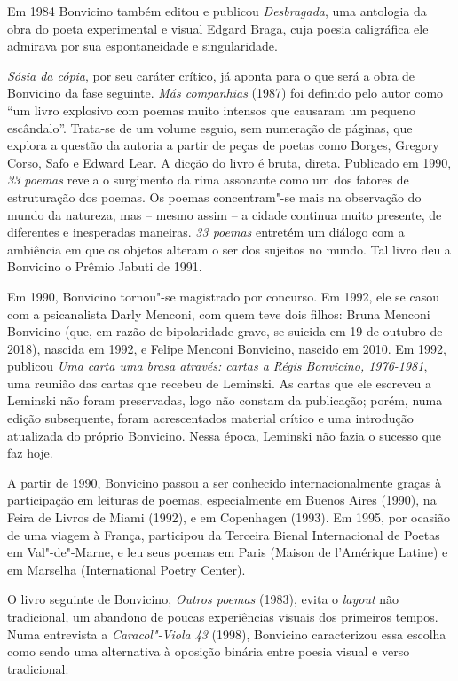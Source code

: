 Em 1984 Bonvicino também editou e publicou \emph{Desbragada}, uma
antologia da obra do poeta experimental e visual Edgard Braga, cuja
poesia caligráfica ele admirava por sua espontaneidade e singularidade.

\emph{Sósia da cópia}, por seu caráter crítico, já aponta para o que
será a obra de Bonvicino da fase seguinte. \emph{Más companhias} (1987)
foi definido pelo autor como ``um livro explosivo com poemas muito
intensos que causaram um pequeno escândalo''. Trata-se de um volume
esguio, sem numeração de páginas, que explora a questão da autoria a
partir de peças de poetas como Borges, Gregory Corso, Safo e Edward
Lear. A dicção do livro é bruta, direta. Publicado em 1990, \emph{33
poemas} revela o surgimento da rima assonante como um dos fatores de
estruturação dos poemas. Os poemas concentram"-se mais na observação do
mundo da natureza, mas -- mesmo assim -- a cidade continua muito
presente, de diferentes e inesperadas maneiras. \emph{33 poemas}
entretém um diálogo com a ambiência em que os objetos alteram o ser dos
sujeitos no mundo. Tal livro deu a Bonvicino o Prêmio Jabuti de 1991.

Em 1990, Bonvicino tornou"-se magistrado por concurso. Em 1992, ele se
casou com a psicanalista Darly Menconi, com quem teve dois filhos: Bruna
Menconi Bonvicino (que, em razão de bipolaridade grave, se suicida em 19
de outubro de 2018), nascida em 1992, e Felipe Menconi Bonvicino,
nascido em 2010. Em 1992, publicou \emph{Uma carta uma brasa através:
cartas a Régis Bonvicino, 1976-1981}, uma reunião das cartas que recebeu
de Leminski. As cartas que ele escreveu a Leminski não foram
preservadas, logo não constam da publicação; porém, numa edição
subsequente, foram acrescentados material crítico e uma introdução
atualizada do próprio Bonvicino. Nessa época, Leminski não fazia o
sucesso que faz hoje.

A partir de 1990, Bonvicino passou a ser conhecido internacionalmente
graças à participação em leituras de poemas, especialmente em Buenos
Aires (1990), na Feira de Livros de Miami (1992), e em Copenhagen
(1993). Em 1995, por ocasião de uma viagem à França, participou da
Terceira Bienal Internacional de Poetas em Val"-de"-Marne, e leu seus
poemas em Paris (Maison de l'Amérique Latine) e em Marselha
(International Poetry Center).

O livro seguinte de Bonvicino, \emph{Outros poemas} (1983), evita o
\emph{layout} não tradicional, um abandono de poucas experiências
visuais dos primeiros tempos. Numa entrevista a \emph{Caracol"-Viola 43}
(1998), Bonvicino caracterizou essa escolha como sendo uma alternativa à
oposição binária entre poesia visual e verso tradicional:

